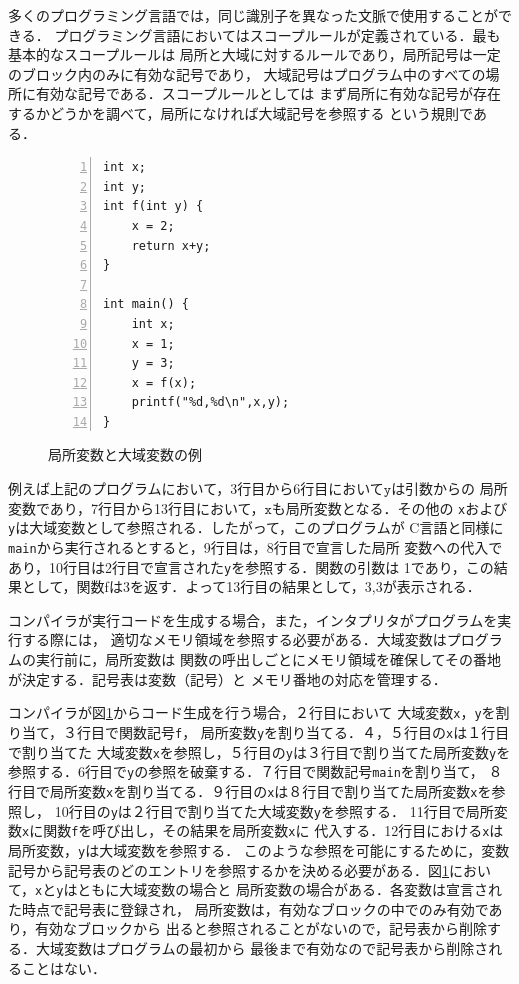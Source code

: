 \documentclass[a4j,dvipdfmx]{jbook}
\begin{document}
多くのプログラミング言語では，同じ識別子を異なった文脈で使用することができる．
プログラミング言語においてはスコープルールが定義されている．最も基本的なスコープルールは
局所と大域に対するルールであり，局所記号は一定のブロック内のみに有効な記号であり，
大域記号はプログラム中のすべての場所に有効な記号である．スコープルールとしては
まず局所に有効な記号が存在するかどうかを調べて，局所になければ大域記号を参照する
という規則である．

\begin{figure}[t]
    \begin{center}
        \begin{minipage}{0.4\linewidth}
            \begin{Verbatim}[frame=single,numbers=left,numberblanklines=false]
int x;
int y;
int f(int y) {
    x = 2;
    return x+y;
}

int main() {
    int x;
    x = 1;
    y = 3;
    x = f(x);
    printf("%d,%d\n",x,y);
}
            \end{Verbatim}
        \end{minipage}
    \end{center}
    \caption{局所変数と大域変数の例}\label{list:scoperule}
\end{figure}

例えば上記のプログラムにおいて，3行目から6行目において$\texttt{y}$は引数からの
局所変数であり，7行目から13行目において，$\texttt{x}$も局所変数となる．その他の
\texttt{x}および\texttt{y}は大域変数として参照される．したがって，このプログラムが
C言語と同様に\texttt{main}から実行されるとすると，9行目は，8行目で宣言した局所
変数への代入であり，10行目は2行目で宣言された\texttt{y}を参照する．関数の引数は
1であり，この結果として，関数fは3を返す．よって13行目の結果として，3,3が表示される．

コンパイラが実行コードを生成する場合，また，インタプリタがプログラムを実行する際には，
適切なメモリ領域を参照する必要がある．大域変数はプログラムの実行前に，局所変数は
関数の呼出しごとにメモリ領域を確保してその番地が決定する．記号表は変数（記号）と
メモリ番地の対応を管理する．

コンパイラが図\ref{list:scoperule}からコード生成を行う場合，２行目において
大域変数\texttt{x}，\texttt{y}を割り当て，３行目で関数記号\texttt{f}，
局所変数\texttt{y}を割り当てる．４，５行目の\texttt{x}は１行目で割り当てた
大域変数\texttt{x}を参照し，５行目の\texttt{y}は３行目で割り当てた局所変数\texttt{y}を
参照する．6行目で\texttt{y}の参照を破棄する．７行目で関数記号\texttt{main}を割り当て，
８行目で局所変数\texttt{x}を割り当てる．９行目の\texttt{x}は８行目で割り当てた局所変数\texttt{x}を参照し，
10行目の\texttt{y}は２行目で割り当てた大域変数\texttt{y}を参照する．
11行目で局所変数\texttt{x}に関数\texttt{f}を呼び出し，その結果を局所変数\texttt{x}に
代入する．12行目における\texttt{x}は局所変数，\texttt{y}は大域変数を参照する．
このような参照を可能にするために，変数記号から記号表のどのエントリを参照するかを決める必要がある．図\ref{list:scoperule}において，\texttt{x}と\texttt{y}はともに大域変数の場合と
局所変数の場合がある．各変数は宣言された時点で記号表に登録され，
局所変数は，有効なブロックの中でのみ有効であり，有効なブロックから
出ると参照されることがないので，記号表から削除する．大域変数はプログラムの最初から
最後まで有効なので記号表から削除されることはない．
\end{document}
